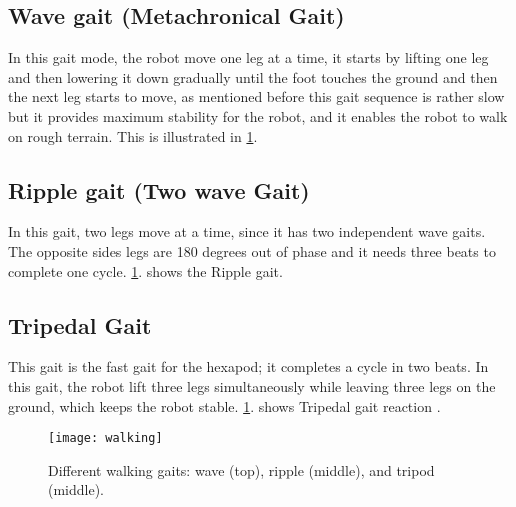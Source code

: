 \subsection{Wave gait (Metachronical Gait)}
In this gait mode, the robot move one leg at a time, it starts by lifting one leg and then lowering it down gradually until the foot touches the ground and then the next leg starts to move, as mentioned before this gait sequence is rather slow but it provides maximum stability for the robot, and it enables the robot to walk on rough terrain. This is illustrated in \ref{walking}.

\subsection{Ripple gait (Two wave Gait)}
In this gait, two legs move at a time, since it has two independent wave gaits. The opposite sides legs are 180 degrees out of phase and it needs three beats to complete one cycle. \ref{walking}. shows the Ripple gait.

\subsection{Tripedal Gait}
This gait is the fast gait for the hexapod; it completes a cycle in two beats. In this gait, the robot lift three legs simultaneously while leaving three legs on the ground, which keeps the robot stable. \ref{walking}. shows Tripedal gait reaction \cite{19}.
\begin{figure}[h]
	\centering
	\texttt{[image: walking]}
	\caption{ Different walking gaits: wave (top), ripple (middle), and tripod (middle).}
	\label{walking}
\end{figure}